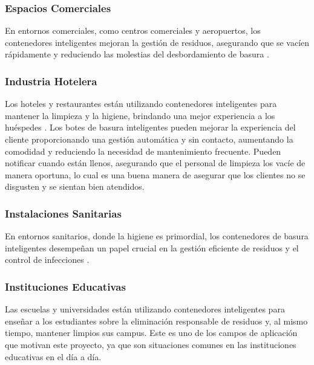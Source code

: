 \subsubsection{Espacios Comerciales}
En entornos comerciales, como centros comerciales y aeropuertos, los contenedores inteligentes mejoran la gestión de residuos, asegurando que se vacíen rápidamente y reduciendo las molestias del desbordamiento de basura \cite{buying}.

\subsubsection{Industria Hotelera}
Los hoteles y restaurantes están utilizando contenedores inteligentes para mantener la limpieza y la higiene, brindando una mejor experiencia a los huéspedes \cite{buying}. Los botes de basura inteligentes pueden mejorar la experiencia del cliente proporcionando una gestión automática y sin contacto, aumentando la comodidad y reduciendo la necesidad de mantenimiento frecuente. Pueden notificar cuando están llenos, asegurando que el personal de limpieza los vacíe de manera oportuna, lo cual es una buena manera de asegurar que los clientes no se disgusten y se sientan bien atendidos.

\subsubsection{Instalaciones Sanitarias}
En entornos sanitarios, donde la higiene es primordial, los contenedores de basura inteligentes desempeñan un papel crucial en la gestión eficiente de residuos y el control de infecciones \cite{buying}.

\subsubsection{Instituciones Educativas}
Las escuelas y universidades están utilizando contenedores inteligentes para enseñar a los estudiantes sobre la eliminación responsable de residuos y, al mismo tiempo, mantener limpios sus campus. Este es uno de los campos de aplicación que motivan este proyecto, ya que son situaciones comunes en las instituciones educativas en el día a día.
